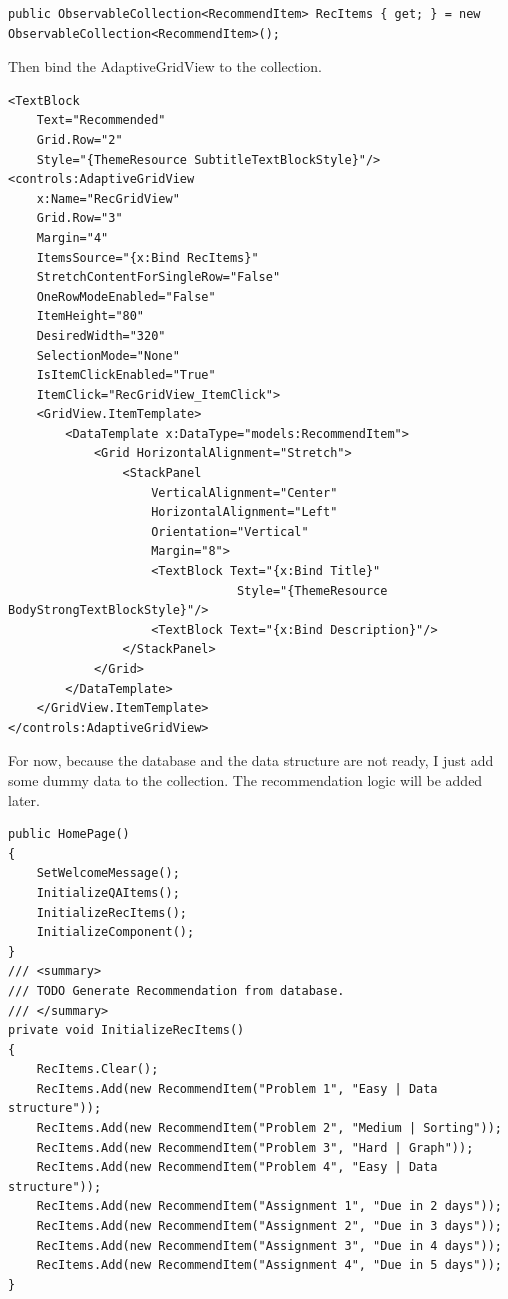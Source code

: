\documentclass[a4paper]{report}
\begin{document}
\begin{verbatim}
public ObservableCollection<RecommendItem> RecItems { get; } = new ObservableCollection<RecommendItem>();
\end{verbatim}

Then bind the AdaptiveGridView to the collection.

\begin{verbatim}
<TextBlock 
    Text="Recommended"
    Grid.Row="2"
    Style="{ThemeResource SubtitleTextBlockStyle}"/>
<controls:AdaptiveGridView
    x:Name="RecGridView"
    Grid.Row="3"
    Margin="4"
    ItemsSource="{x:Bind RecItems}"
    StretchContentForSingleRow="False"
    OneRowModeEnabled="False"
    ItemHeight="80"
    DesiredWidth="320"
    SelectionMode="None"
    IsItemClickEnabled="True"
    ItemClick="RecGridView_ItemClick">
    <GridView.ItemTemplate>
        <DataTemplate x:DataType="models:RecommendItem">
            <Grid HorizontalAlignment="Stretch">
                <StackPanel 
                    VerticalAlignment="Center"
                    HorizontalAlignment="Left"
                    Orientation="Vertical"
                    Margin="8">
                    <TextBlock Text="{x:Bind Title}"
                                Style="{ThemeResource BodyStrongTextBlockStyle}"/>
                    <TextBlock Text="{x:Bind Description}"/>
                </StackPanel>
            </Grid>
        </DataTemplate>
    </GridView.ItemTemplate>
</controls:AdaptiveGridView>
\end{verbatim}

For now, because the database and the data structure are not ready, I just add some dummy data to the collection. The recommendation logic will be added later.

\begin{verbatim}
public HomePage()
{
    SetWelcomeMessage();
    InitializeQAItems();
    InitializeRecItems();
    InitializeComponent();
}
/// <summary>
/// TODO Generate Recommendation from database.
/// </summary>
private void InitializeRecItems()
{
    RecItems.Clear();
    RecItems.Add(new RecommendItem("Problem 1", "Easy | Data structure"));
    RecItems.Add(new RecommendItem("Problem 2", "Medium | Sorting"));
    RecItems.Add(new RecommendItem("Problem 3", "Hard | Graph"));
    RecItems.Add(new RecommendItem("Problem 4", "Easy | Data structure"));
    RecItems.Add(new RecommendItem("Assignment 1", "Due in 2 days"));
    RecItems.Add(new RecommendItem("Assignment 2", "Due in 3 days"));
    RecItems.Add(new RecommendItem("Assignment 3", "Due in 4 days"));
    RecItems.Add(new RecommendItem("Assignment 4", "Due in 5 days"));
}
\end{verbatim}
\end{document}
